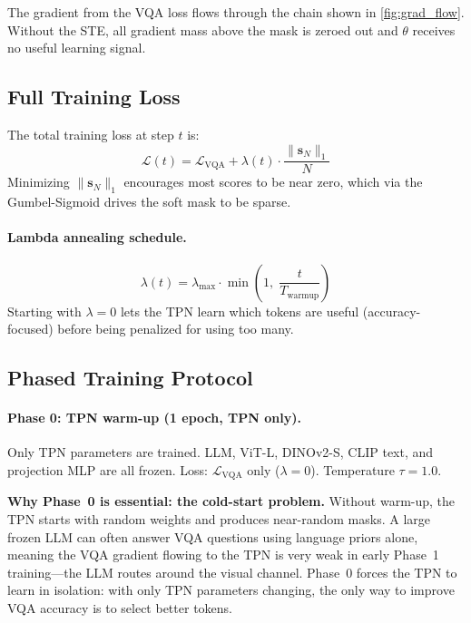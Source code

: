 \documentclass[12pt,a4paper]{article}
\newcommand{\vs}{\mathbf{s}}     %
\begin{document}
The gradient from the VQA loss flows through the chain shown in
\cref{fig:grad_flow}. Without the STE, all gradient mass above the mask is
zeroed out and $\theta$ receives no useful learning signal.

\subsection{Full Training Loss}

The total training loss at step $t$ is:
\begin{equation}
  \mathcal{L}(t) = \mathcal{L}_{\mathrm{VQA}}
    + \lambda(t) \cdot \frac{\|\vs_N\|_1}{N}
  \label{eq:total_loss}
\end{equation}
Minimizing $\|\vs_N\|_1$ encourages most scores to be near zero, which via the
Gumbel-Sigmoid drives the soft mask to be sparse.

\paragraph{Lambda annealing schedule.}
\begin{equation}
  \lambda(t) = \lambda_{\max} \cdot
    \min\!\left(1,\; \frac{t}{T_{\mathrm{warmup}}}\right)
  \label{eq:lambda_anneal}
\end{equation}
Starting with $\lambda = 0$ lets the TPN learn which tokens are useful
(accuracy-focused) before being penalized for using too many.

\subsection{Phased Training Protocol}

\paragraph{Phase 0: TPN warm-up (1 epoch, TPN only).}
Only TPN parameters are trained. LLM, ViT-L, DINOv2-S, CLIP text, and projection
MLP are all frozen. Loss: $\mathcal{L}_{\mathrm{VQA}}$ only ($\lambda = 0$).
Temperature $\tau = 1.0$.

\textbf{Why Phase~0 is essential: the cold-start problem.} Without warm-up, the
TPN starts with random weights and produces near-random masks. A large frozen
LLM can often answer VQA questions using language priors alone, meaning the VQA
gradient flowing to the TPN is very weak in early Phase~1 training---the LLM
routes around the visual channel. Phase~0 forces the TPN to learn in isolation:
with only TPN parameters changing, the only way to improve VQA accuracy is to
select better tokens.
\end{document}

